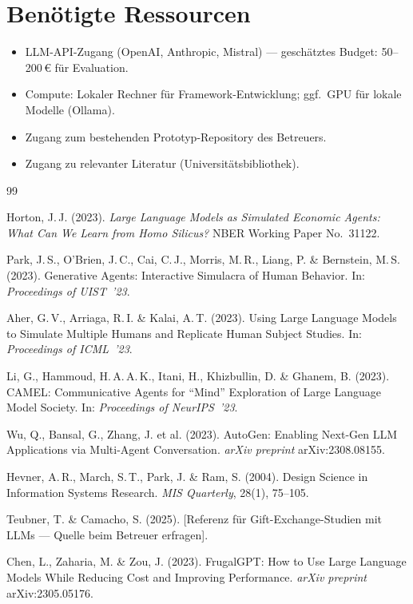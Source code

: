\documentclass[12pt, a4paper]{article}
\begin{document}
\section{Benötigte Ressourcen}

\begin{itemize}
    \item LLM-API-Zugang (OpenAI, Anthropic, Mistral) --- geschätztes Budget: 50--200\,€ für Evaluation.
    \item Compute: Lokaler Rechner für Framework-Entwicklung; ggf.\ GPU für lokale Modelle (Ollama).
    \item Zugang zum bestehenden Prototyp-Repository des Betreuers.
    \item Zugang zu relevanter Literatur (Universitätsbibliothek).
\end{itemize}


\begin{thebibliography}{99}

Horton, J.\,J. (2023).
\textit{Large Language Models as Simulated Economic Agents: What Can We Learn from Homo Silicus?}
NBER Working Paper No.\ 31122.

Park, J.\,S., O'Brien, J.\,C., Cai, C.\,J., Morris, M.\,R., Liang, P. \& Bernstein, M.\,S. (2023).
Generative Agents: Interactive Simulacra of Human Behavior.
In: \textit{Proceedings of UIST~'23}.

Aher, G.\,V., Arriaga, R.\,I. \& Kalai, A.\,T. (2023).
Using Large Language Models to Simulate Multiple Humans and Replicate Human Subject Studies.
In: \textit{Proceedings of ICML~'23}.

Li, G., Hammoud, H.\,A.\,A.\,K., Itani, H., Khizbullin, D. \& Ghanem, B. (2023).
CAMEL: Communicative Agents for ``Mind'' Exploration of Large Language Model Society.
In: \textit{Proceedings of NeurIPS~'23}.

Wu, Q., Bansal, G., Zhang, J. et al. (2023).
AutoGen: Enabling Next-Gen LLM Applications via Multi-Agent Conversation.
\textit{arXiv preprint} arXiv:2308.08155.

Hevner, A.\,R., March, S.\,T., Park, J. \& Ram, S. (2004).
Design Science in Information Systems Research.
\textit{MIS Quarterly}, 28(1), 75--105.

Teubner, T. \& Camacho, S. (2025).
[Referenz für Gift-Exchange-Studien mit LLMs --- Quelle beim Betreuer erfragen].

Chen, L., Zaharia, M. \& Zou, J. (2023).
FrugalGPT: How to Use Large Language Models While Reducing Cost and Improving Performance.
\textit{arXiv preprint} arXiv:2305.05176.

\end{thebibliography}
\end{document}
